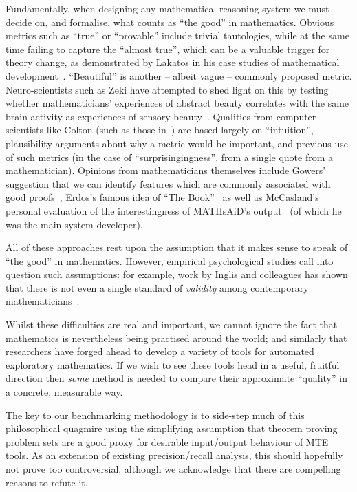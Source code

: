 Fundamentally, when designing any mathematical reasoning system we must decide
on, and formalise, what counts as ``the good'' in mathematics.  Obvious metrics
such as ``true'' or ``provable'' include trivial tautologies, while at the same
time failing to capture the ``almost true'', which can be a valuable trigger for
theory change, as demonstrated by Lakatos in his case studies of mathematical
development~\cite{lakatos}. ``Beautiful'' is another -- albeit vague -- commonly
proposed metric. Neuro-scientists such as Zeki \etal{} have attempted to shed
light on this by testing whether mathematicians' experiences of abstract beauty
correlates with the same brain activity as experiences of sensory
beauty~\cite{10.3389/fnhum.2014.00068}. Qualities from computer scientists like
Colton (such as those in~\cite{colton2000notion}) are based largely on
``intuition'', plausibility arguments about why a metric would be important, and
previous use of such metrics (in the case of ``surprisingingness'', from a
single quote from a mathematician). Opinions from mathematicians themselves
include Gowers' suggestion that we can identify features which are commonly
associated with good proofs~\cite{gowers2000two}, Erdos's famous idea of ``The
Book''~\cite{aigner2010proofs} as well as McCasland's personal evaluation of the
interestingness of MATHsAiD's output~\cite{roy} (of which he was the main system
developer).

All of these approaches rest upon the assumption that it makes sense to speak of
``the good'' in mathematics. However, empirical psychological studies
call into question such assumptions: for example, work by Inglis and colleagues
has shown that there is not even a single standard of \emph{validity} among
contemporary mathematicians~\cite{inglis2013mathematicians}.

Whilst these difficulties are real and important, we cannot ignore the fact that
mathematics is nevertheless being practised around the world; and similarly that
researchers have forged ahead to develop a variety of tools for automated
exploratory mathematics. If we wish to see these tools head in a useful,
fruitful direction then \emph{some} method is needed to compare their
approximate ``quality'' in a concrete, measurable way.

The key to our benchmarking methodology is to side-step much of this
philosophical quagmire using the simplifying assumption that theorem proving
problem sets are a good proxy for desirable input/output behaviour of MTE tools.
As an extension of existing precision/recall analysis, this should hopefully not
prove too controversial, although we acknowledge that there are compelling
reasons to refute it.

